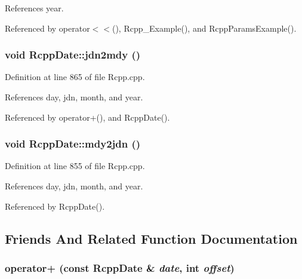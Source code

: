 References year.

Referenced by operator$<$$<$(), Rcpp\_\-Example(), and RcppParamsExample().\hypertarget{classRcppDate_ca9e6ccbf5bf76e9bba92f2a3083c135}{
\subsubsection[{jdn2mdy}]{\setlength{\rightskip}{0pt plus 5cm}void RcppDate::jdn2mdy ()}}
\label{classRcppDate_ca9e6ccbf5bf76e9bba92f2a3083c135}




Definition at line 865 of file Rcpp.cpp.

References day, jdn, month, and year.

Referenced by operator+(), and RcppDate().\hypertarget{classRcppDate_aaa626a51e3b2eb4978caf5dcdf9df70}{
\subsubsection[{mdy2jdn}]{\setlength{\rightskip}{0pt plus 5cm}void RcppDate::mdy2jdn ()}}
\label{classRcppDate_aaa626a51e3b2eb4978caf5dcdf9df70}




Definition at line 855 of file Rcpp.cpp.

References day, jdn, month, and year.

Referenced by RcppDate().

\subsection{Friends And Related Function Documentation}
\hypertarget{classRcppDate_dd881a27c2b8e36897a59bca1d04585f}{
\subsubsection[{operator+}]{ operator+ (const {\bf RcppDate} \& {\em date}, \/  int {\em offset})}}
\label{classRcppDate_dd881a27c2b8e36897a59bca1d04585f}





